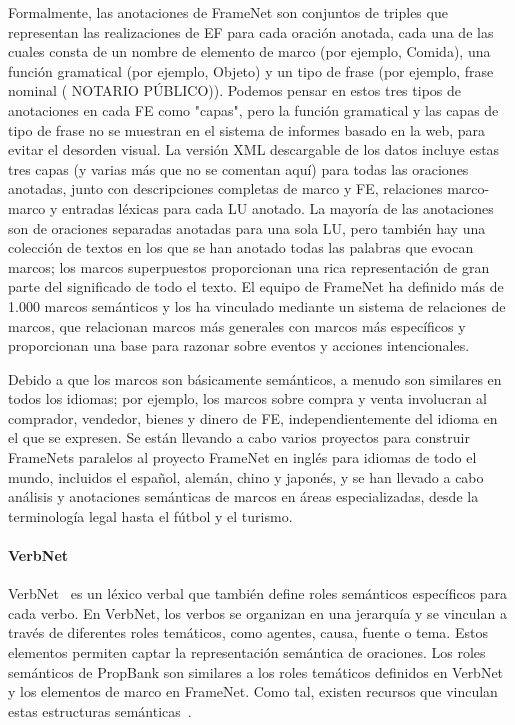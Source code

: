 Formalmente, las anotaciones de FrameNet son conjuntos de triples que representan las realizaciones de EF para cada oración anotada, cada una de las cuales consta de un nombre de elemento de marco (por ejemplo, Comida), una función gramatical (por ejemplo, Objeto) y un tipo de frase (por ejemplo, frase nominal ( NOTARIO PÚBLICO)). Podemos pensar en estos tres tipos de anotaciones en cada FE como "capas", pero la función gramatical y las capas de tipo de frase no se muestran en el sistema de informes basado en la web, para evitar el desorden visual. La versión XML descargable de los datos incluye estas tres capas (y varias más que no se comentan aquí) para todas las oraciones anotadas, junto con descripciones completas de marco y FE, relaciones marco-marco y entradas léxicas para cada LU anotado. La mayoría de las anotaciones son de oraciones separadas anotadas para una sola LU, pero también hay una colección de textos en los que se han anotado todas las palabras que evocan marcos; los marcos superpuestos proporcionan una rica representación de gran parte del significado de todo el texto. El equipo de FrameNet ha definido más de 1.000 marcos semánticos y los ha vinculado mediante un sistema de relaciones de marcos, que relacionan marcos más generales con marcos más específicos y proporcionan una base para razonar sobre eventos y acciones intencionales.

Debido a que los marcos son básicamente semánticos, a menudo son similares en todos los idiomas; por ejemplo, los marcos sobre compra y venta involucran al comprador, vendedor, bienes y dinero de FE, independientemente del idioma en el que se expresen. Se están llevando a cabo varios proyectos para construir FrameNets paralelos al proyecto FrameNet en inglés para idiomas de todo el mundo, incluidos el español, alemán, chino y japonés, y se han llevado a cabo análisis y anotaciones semánticas de marcos en áreas especializadas, desde la terminología legal hasta el fútbol y el turismo.

\paragraph{VerbNet}

VerbNet~\cite{verbnet} es un léxico verbal que también define roles semánticos específicos para cada verbo. En VerbNet, los verbos se organizan en una jerarquía y se vinculan a través de diferentes roles temáticos, como agentes, causa, fuente o tema. Estos elementos permiten captar la representación semántica de oraciones.
Los roles semánticos de PropBank son similares a los roles temáticos definidos en VerbNet y los elementos de marco en FrameNet. Como tal, existen recursos que vinculan estas estructuras semánticas~\cite{semlink}.

